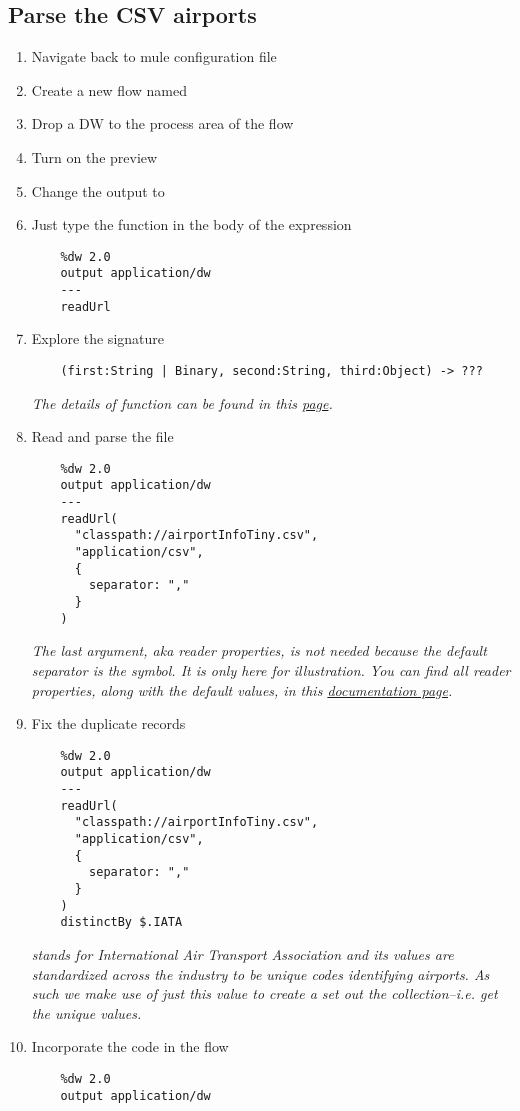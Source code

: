 \subsection{Parse the CSV airports}
\begin{enumerate}[resume*]
\item Navigate back to  mule configuration file
\item Create a new flow named 
\item Drop a DW to the process area of the flow
\item Turn on the preview
\item Change the output to 
\item Just type the function  in the body of the expression
  \begin{verbatim}
    %dw 2.0
    output application/dw
    ---
    readUrl
  \end{verbatim}
\item Explore the signature
  \begin{verbatim}
    (first:String | Binary, second:String, third:Object) -> ???
  \end{verbatim}
  \emph{
    The details of  function can be found in this \href{https://docs.mulesoft.com/mule-runtime/4.3/dw-core-functions-readurl}{page}.
  }
\item Read and parse the file
  \begin{verbatim}
    %dw 2.0
    output application/dw
    ---
    readUrl(
      "classpath://airportInfoTiny.csv",
      "application/csv",
      {
        separator: ","
      }
    )
  \end{verbatim}
  \emph{
    The last argument, aka reader properties, is not needed because the default separator is the \ttt{,} symbol.  It is only here for illustration.  You can find all reader properties, along with the default values, in this \href{https://docs.mulesoft.com/mule-runtime/4.3/dataweave-formats-csv\#reader-properties}{documentation page}.
  }
\item Fix the duplicate records
  \begin{verbatim}
    %dw 2.0
    output application/dw
    ---
    readUrl(
      "classpath://airportInfoTiny.csv",
      "application/csv",
      {
        separator: ","
      }
    )
    distinctBy $.IATA
  \end{verbatim}
  \emph{
     stands for International Air Transport Association and its values are standardized across the industry to be unique codes identifying airports.  As such we make use of just this value to create a set out the collection--i.e. get the unique values.
  }
\item Incorporate the code in the  flow
  \begin{verbatim}
    %dw 2.0
    output application/dw


\end{verbatim}
\end{enumerate}
